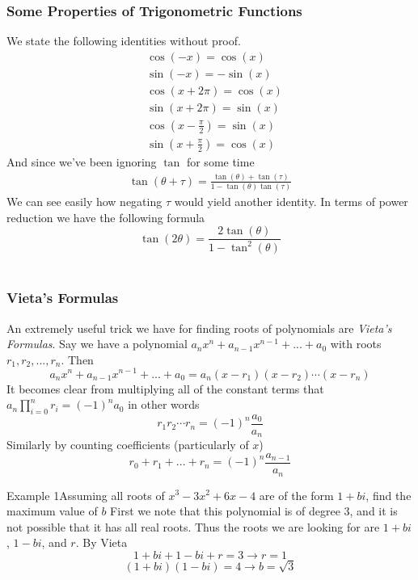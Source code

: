 \subsubsection{Some Properties of Trigonometric Functions}
We state the following identities without proof.
\begin{align*}
	&\cos(-x) = \cos(x)\\
	&\sin(-x) = -\sin(x)\\
	&\cos(x + 2\pi) = \cos(x)\\
	&\sin(x + 2\pi) = \sin(x)\\
	&\cos\left(x - \frac{\pi}{2}\right) = \sin(x)\\
	&\sin\left( x + \frac{\pi}{2}\right) = \cos(x)
\end{align*}
And since we've been ignoring $\tan$ for some time
\begin{align*}
	\tan(\theta + \tau) = \frac{\tan(\theta)+\tan(\tau)}{1-\tan(\theta)\tan(\tau)}
\end{align*}
We can see easily how negating $\tau$ would yield another identity. In terms of power reduction we have the following formula 
$$\tan(2\theta) = \frac{2\tan(\theta)}{1-\tan^{2}(\theta)}$$\\

\subsubsection{Vieta's Formulas}
An extremely useful trick we have for finding roots of polynomials are \textit{Vieta's Formulas}.
Say we have a polynomial $a_n x^n + a_{n-1}x^{n-1} + ... + a_{0}$ with roots $r_{1}, r_2, ..., r_n$.
Then $$a_{n}x^n + a_{n-1}x^{n-1} + ... + a_0 = a_{n}(x-r_1)(x-r_2)\cdots(x-r_n)$$
It becomes clear from multiplying all of the constant terms that $a_{n}\prod_{i=0}^{n}r_i = (-1)^{n}a_0$ in other words $$r_1 r_2 \cdots r_n = (-1)^{n}\frac{a_0}{a_n}$$
Similarly by counting coefficients (particularly of $x$)$$r_0 + r_1 + ... + r_n = (-1)^{n} \frac{a_{n-1}}{a_n}$$

\begin{problem}{Example 1}{Assuming all roots of $x^3 - 3x^2 + 6x - 4$ are of the form $1+bi$, find the maximum value of $b$}
	First we note that this polynomial is of degree 3, and it is not possible that it has all real roots.
	Thus the roots we are looking for are $1+bi$, $1-bi$, and $r$. By Vieta $$1+bi + 1 -bi + r = 3 \rightarrow r = 1$$
	$$(1+bi)(1-bi) = 4 \rightarrow b = \sqrt{3}$$
\end{problem}

